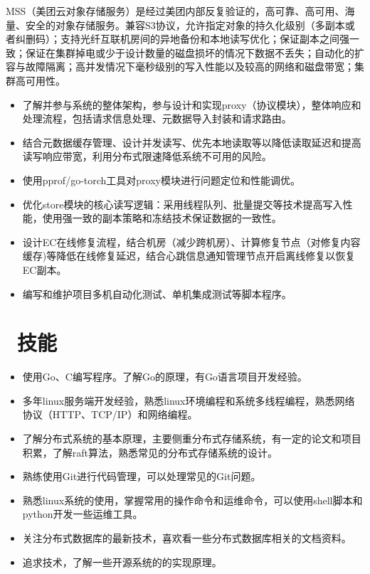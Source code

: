 \documentclass{resume}
\begin{document}
MSS（美团云对象存储服务）是经过美团内部反复验证的，高可靠、高可用、海量、安全的对象存储服务。兼容S3协议，允许指定对象的持久化级别（多副本或者纠删码）；支持光纤互联机房间的异地备份和本地读写优化；保证副本之间强一致；保证在集群掉电或少于设计数量的磁盘损坏的情况下数据不丢失；自动化的扩容与故障隔离；高并发情况下毫秒级别的写入性能以及较高的网络和磁盘带宽；集群高可用性。
\begin{itemize}
  \item 了解并参与系统的整体架构，参与设计和实现proxy（协议模块），整体响应和处理流程，包括请求信息处理、元数据导入封装和请求路由。
  \item 结合元数据缓存管理、设计并发读写、优先本地读取等以降低读取延迟和提高读写响应带宽，利用分布式限速降低系统不可用的风险。
  \item 使用pprof/go-torch工具对proxy模块进行问题定位和性能调优。
  \item 优化store模块的核心读写逻辑：采用线程队列、批量提交等技术提高写入性能，使用强一致的副本策略和冻结技术保证数据的一致性。
  \item 设计EC在线修复流程，结合机房（减少跨机房）、计算修复节点（对修复内容缓存)等降低在线修复延迟，结合心跳信息通知管理节点开启离线修复以恢复EC副本。
  \item 编写和维护项目多机自动化测试、单机集成测试等脚本程序。
\end{itemize}


\section{\faCogs\  技能}
\begin{itemize}[parsep=0.5ex]
  \item 使用Go、C编写程序。了解Go的原理，有Go语言项目开发经验。
  \item 多年linux服务端开发经验，熟悉linux环境编程和系统多线程编程，熟悉网络协议（HTTP、TCP/IP）和网络编程。
  \item 了解分布式系统的基本原理，主要侧重分布式存储系统，有一定的论文和项目积累，了解raft算法，熟悉常见的分布式存储系统的设计。
  \item 熟练使用Git进行代码管理，可以处理常见的Git问题。
  \item 熟悉linux系统的使用，掌握常用的操作命令和运维命令，可以使用shell脚本和python开发一些运维工具。
  \item 关注分布式数据库的最新技术，喜欢看一些分布式数据库相关的文档资料。
  \item 追求技术，了解一些开源系统的的实现原理。
\end{itemize}
\end{document}

